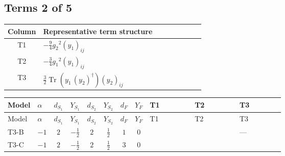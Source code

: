 \documentclass[8pt]{article}
\begin{document}
\begin{landscape}
\subsection*{Terms 2 of 5}
\begin{center}
\begin{tabular}{@{}c >{\raggedright\arraybackslash}p{0.82\linewidth}@{}}
\toprule
Column & Representative term structure \\
\midrule
T1 & \(\displaystyle -\frac{9}{4} {g_2}^2 \left({y_1}\right)_{ij}\) \\
\midrule
T2 & \(\displaystyle -\frac{3}{4} {g_1}^2 \left({y_1}\right)_{ij}\) \\
\midrule
T3 & \(\displaystyle \frac{3}{2} \operatorname{Tr}\!\left({y_1}\,\left({y_2}\right)^{\dagger}\right) \left({y_2}\right)_{ij}\) \\
\midrule
\bottomrule
\end{tabular}
\end{center}
\smallskip
\tiny
\begin{longtable}{@{}llcccccc >{\raggedright\arraybackslash}p{0.21\linewidth} >{\raggedright\arraybackslash}p{0.21\linewidth} >{\raggedright\arraybackslash}p{0.21\linewidth}@{}}
\toprule
Model & $\alpha$ & $d_{S_1}$ & $Y_{S_1}$ & $d_{S_2}$ & $Y_{S_2}$ & $d_F$ & $Y_F$ & T1 & T2 & T3 \\
\midrule
\endfirsthead
\toprule
Model & $\alpha$ & $d_{S_1}$ & $Y_{S_1}$ & $d_{S_2}$ & $Y_{S_2}$ & $d_F$ & $Y_F$ & T1 & T2 & T3 \\
\midrule
\endhead
T3-B & $-1$ & $2$ & $-\frac{1}{2}$ & $2$ & $\frac{1}{2}$ & $1$ & $0$ & \scriptsize\adjustbox{max width=\linewidth}{$\begin{gathered} -\frac{9}{4} {g_2}^2 \left({y_1}\right)_{ij}\end{gathered}$} & \scriptsize\adjustbox{max width=\linewidth}{$\begin{gathered} -\frac{3}{4} {g_1}^2 \left({y_1}\right)_{ij}\end{gathered}$} & --- \\
\midrule
T3-C & $-1$ & $2$ & $-\frac{1}{2}$ & $2$ & $\frac{1}{2}$ & $3$ & $0$ & \scriptsize\adjustbox{max width=\linewidth}{$\begin{gathered} -\frac{33}{4} {g_2}^2 \left({y_1}\right)_{ij}\end{gathered}$} & \scriptsize\adjustbox{max width=\linewidth}{$\begin{gathered} -\frac{3}{4} {g_1}^2 \left({y_1}\right)_{ij}\end{gathered}$} & \scriptsize\adjustbox{max width=\linewidth}{$\begin{gathered} \frac{3}{2} \operatorname{Tr}\!\left({y_1}\,\left({y_2}\right)^{\dagger}\right) \left({y_2}\right)_{ij}\end{gathered}$} \\

\end{longtable}
\end{landscape}
\end{document}
